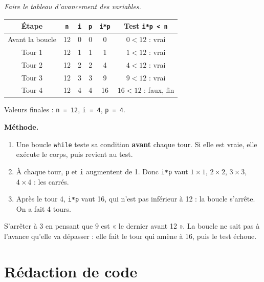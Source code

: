 \documentclass[addpoints, 11pt]{exam}
\newcommand{\enonce}[1]{\textit{#1}\par\smallskip}
\newcommand{\methode}{\par\smallskip\noindent\textbf{Méthode.}\ }
\newcommand{\code}[1]{\texttt{#1}}
\DeclareRobustCommand{\_}{\textunderscore\allowbreak}
\begin{document}
\begin{questions}
\question[4] \enonce{Faire le tableau d'avancement des variables.}
\begin{reponse}
\begin{center}
\begin{tabular}{|c|c|c|c|c|c|}
\hline
Étape & \code{n} & \code{i} & \code{p} & \code{i*p} & Test \code{i*p < n} \\ \hline
Avant la boucle & 12 & 0 & 0 & 0 & $0 < 12$ : vrai \\
Tour 1 & 12 & 1 & 1 & 1 & $1 < 12$ : vrai \\
Tour 2 & 12 & 2 & 2 & 4 & $4 < 12$ : vrai \\
Tour 3 & 12 & 3 & 3 & 9 & $9 < 12$ : vrai \\
Tour 4 & 12 & 4 & 4 & 16 & $16 < 12$ : faux, fin \\ \hline
\end{tabular}
\end{center}
Valeurs finales : \code{n = 12}, \code{i = 4}, \code{p = 4}.
\end{reponse}
\methode
\begin{enumerate}
  \item Une boucle \code{while} teste sa condition \textbf{avant} chaque tour. Si elle est vraie, elle exécute le corps, puis revient au test.
  \item À chaque tour, \code{p} et \code{i} augmentent de 1. Donc \code{i*p} vaut $1 \times 1$, $2 \times 2$, $3 \times 3$, $4 \times 4$ : les carrés.
  \item Après le tour 4, \code{i*p} vaut 16, qui n'est pas inférieur à 12 : la boucle s'arrête. On a fait 4 tours.
\end{enumerate}
\begin{erreur}
S'arrêter à 3 en pensant que $9$ est « le dernier avant 12 ». La boucle ne sait pas à l'avance qu'elle va dépasser : elle fait le tour qui amène à 16, puis le test échoue.
\end{erreur}

\section{Rédaction de code}


\end{questions}
\end{document}

